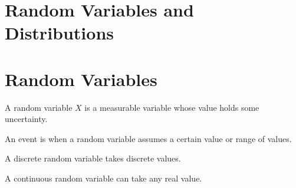 \documentclass{article}
\begin{document}
\section{Random Variables and Distributions}
\section{Random Variables}
\begin{definition}
    A random variable \(X\) is a measurable variable whose value holds some uncertainty.
\end{definition}
An event is when a random variable assumes a certain value or range of values.
\begin{definition}
    A discrete random variable takes discrete values.
\end{definition}
\begin{definition}
    A continuous random variable can take any real value.
\end{definition}
\end{document}
